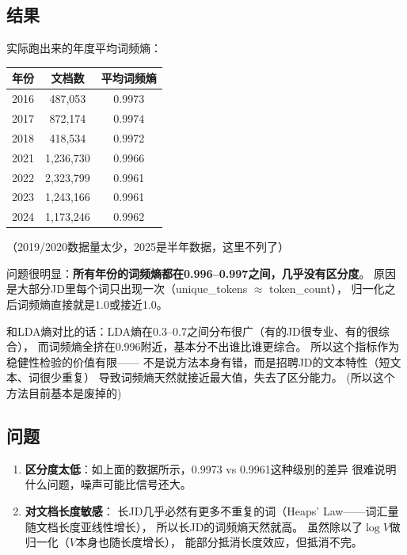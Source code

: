 \documentclass[12pt,a4paper]{ctexart}
\begin{document}
\subsection{结果}

实际跑出来的年度平均词频熵：

\begin{table}[h]
\centering
\small
\begin{tabular}{ccc}
\toprule
年份 & 文档数 & 平均词频熵 \\
\midrule
2016 & 487,053 & 0.9973 \\
2017 & 872,174 & 0.9974 \\
2018 & 418,534 & 0.9972 \\
2021 & 1,236,730 & 0.9966 \\
2022 & 2,323,799 & 0.9961 \\
2023 & 1,243,166 & 0.9961 \\
2024 & 1,173,246 & 0.9962 \\
\bottomrule
\end{tabular}
\end{table}

（2019/2020数据量太少，2025是半年数据，这里不列了）

问题很明显：\textbf{所有年份的词频熵都在0.996--0.997之间，几乎没有区分度}。
原因是大部分JD里每个词只出现一次（unique\_tokens $\approx$ token\_count），
归一化之后词频熵直接就是1.0或接近1.0。

和LDA熵对比的话：LDA熵在0.3--0.7之间分布很广（有的JD很专业、有的很综合），
而词频熵全挤在0.996附近，基本分不出谁比谁更综合。
所以这个指标作为稳健性检验的价值有限——
不是说方法本身有错，而是招聘JD的文本特性（短文本、词很少重复）
导致词频熵天然就接近最大值，失去了区分能力。
(所以这个方法目前基本是废掉的)

\subsection{问题}
\begin{enumerate}
\item \textbf{区分度太低}：如上面的数据所示，0.9973 vs 0.9961这种级别的差异
很难说明什么问题，噪声可能比信号还大。
\item \textbf{对文档长度敏感}：
长JD几乎必然有更多不重复的词（Heaps' Law——词汇量随文档长度亚线性增长），
所以长JD的词频熵天然就高。
虽然除以了$\log V$做归一化（$V$本身也随长度增长），
能部分抵消长度效应，但抵消不完。
\end{enumerate}


\end{document}
